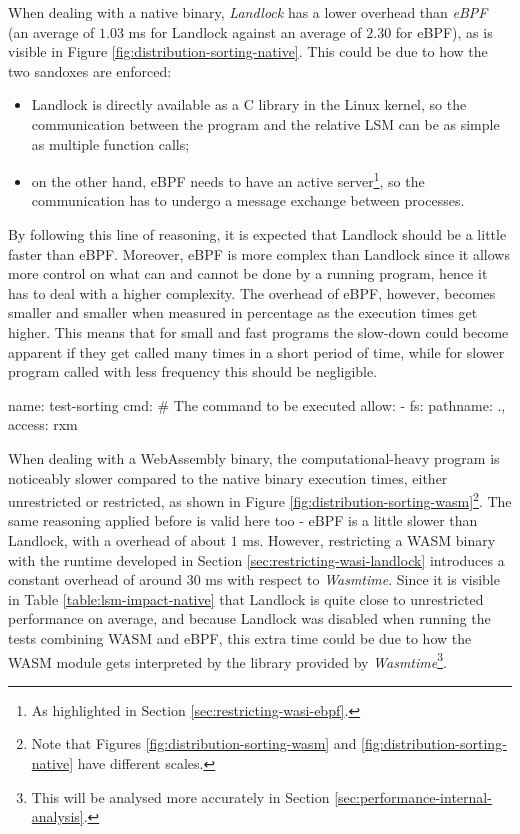 When dealing with a native binary, \textit{Landlock} has a lower overhead than \textit{eBPF} (an average
of $1.03$ ms for Landlock against an average of $2.30$ for eBPF), as is visible in Figure \ref{fig:distribution-sorting-native}.
This could be due to how the two sandoxes are enforced:
\begin{itemize}
  \item Landlock is directly available as a C library in the Linux kernel, so the communication between
        the program and the relative LSM can be as simple as multiple function calls;
  \item on the other hand, eBPF needs to have an active server\footnote{As highlighted in Section \ref{sec:restricting-wasi-ebpf}.},
        so the communication has to undergo a message exchange between processes.
\end{itemize}
By following this line of reasoning, it is expected that Landlock should be a little faster than eBPF.
Moreover, eBPF is more complex than Landlock since it allows more control on what
can and cannot be done by a running program, hence it has to deal with a higher complexity.
The overhead of eBPF, however, becomes smaller and smaller when measured in percentage as the execution times get higher.
This means that for small and fast programs the slow-down could become apparent if they get called many times
in a short period of time, while for slower program called with less frequency this should be negligible.

\vspace*{0.5cm}
\begin{code}[language=yaml, caption=The outline of the policy used for testing the sorting program., label=lst:outline-policy-sorting-test]
name: test-sorting
cmd: # The command to be executed
allow:
- fs: {pathname: ., access: rxm}
\end{code}

When dealing with a WebAssembly binary, the computational-heavy program is noticeably slower
compared to the native binary execution times, either unrestricted or restricted, as shown in Figure
\ref{fig:distribution-sorting-wasm}\footnote{Note that Figures \ref{fig:distribution-sorting-wasm} and \ref{fig:distribution-sorting-native}
have different scales.}.
The same reasoning applied before is valid here too - eBPF is a little slower than Landlock, with a overhead
of about $1$ ms.
However, restricting a WASM binary with the runtime developed in Section \ref{sec:restricting-wasi-landlock}
introduces a constant overhead of around $30$ ms with respect to \textit{Wasmtime}.
Since it is visible in Table \ref{table:lsm-impact-native} that Landlock is quite close to
unrestricted performance on average, and because Landlock was disabled when running
the tests combining WASM and eBPF, this extra time could be due to how the WASM module gets
interpreted by the library provided by \textit{Wasmtime}\footnote{This will be analysed more
accurately in Section \ref{sec:performance-internal-analysis}.}.

